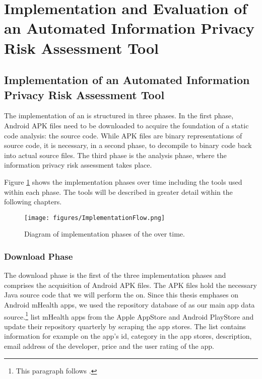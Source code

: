 \section{Implementation and Evaluation of an Automated Information Privacy Risk Assessment Tool}

\subsection{Implementation of an Automated Information Privacy Risk Assessment Tool}

The implementation of an \aiprat is structured in three phases.
In the first phase, Android APK files need to be downloaded to acquire the foundation of a static code analysis: the source code.
While APK files are binary representations of source code, it is necessary, in a second phase, to decompile to binary code back into actual source files.
The third phase is the analysis phase, where the information privacy risk assessment takes place.

Figure \ref{fig:implementationPhases} shows the implementation phases over time including the tools used within each phase. 
The tools will be described in greater detail within the following chapters.

\begin{figure}[h]
	\centering
	\texttt{[image: figures/ImplementationFlow.png]}
	\label{fig:implementationPhases}
	\caption{Diagram of implementation phases of the \aiprat over time.}
\end{figure}

\subsubsection{Download Phase}

The download phase is the first of the three implementation phases and comprises the acquisition of Android APK files. 
The APK files hold the necessary Java source code that we will perform the \sca on.
Since this thesis emphases on Android mHealth apps, we used the repository database of \cite{Xu2015} as our main app data source.\footnote{This paragraph follows \cite{Xu2015}.}
\cite{Xu2015} list mHealth apps from the Apple AppStore and Android PlayStore and update their repository quarterly by scraping the app stores.
The list contains information for example on the app's id, category in the app stores, description, email address of the developer, price and the user rating of the app.


